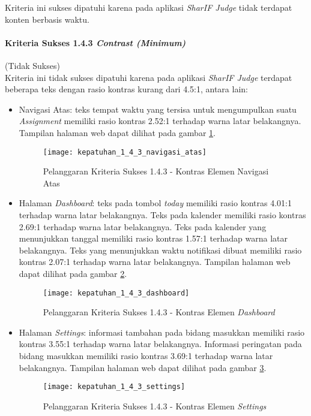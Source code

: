 Kriteria ini sukses dipatuhi karena pada aplikasi \textit{SharIF Judge} tidak terdapat konten berbasis waktu.

\paragraph{Kriteria Sukses 1.4.3 \textit{Contrast (Minimum)}}
\label{subsubsec:kepatuhan_kriteria_1.4.3}
(Tidak Sukses) \\

Kriteria ini tidak sukses dipatuhi karena pada aplikasi \textit{SharIF Judge} terdapat beberapa teks dengan rasio kontras kurang dari 4.5:1, antara lain:
\begin{itemize}
	\item Navigasi Atas: teks tempat waktu yang tersisa untuk mengumpulkan suatu \textit{Assignment} memiliki rasio kontras 2.52:1 terhadap warna latar belakangnya. Tampilan halaman web dapat dilihat pada gambar \ref{fig:kepatuhan_1_4_3_navigasi_atas}.
	\begin{figure}[H]
		\centering  
		\texttt{[image: kepatuhan\_1\_4\_3\_navigasi\_atas]}  
		\caption[Pelanggaran Kriteria Sukses 1.4.3 - Kontras Elemen Navigasi Atas]{Pelanggaran Kriteria Sukses 1.4.3 - Kontras Elemen Navigasi Atas} 
		\label{fig:kepatuhan_1_4_3_navigasi_atas} 
	\end{figure}

	\item Halaman \textit{Dashboard}: teks pada tombol \textit{today} memiliki rasio kontras 4.01:1 terhadap warna latar belakangnya. Teks pada kalender memiliki rasio kontras 2.69:1 terhadap warna latar belakangnya. Teks pada kalender yang menunjukkan tanggal memiliki rasio kontras 1.57:1 terhadap warna latar belakangnya. Teks yang menunjukkan waktu notifikasi dibuat memiliki rasio kontras 2.07:1 terhadap warna latar belakangnya. Tampilan halaman web dapat dilihat pada gambar \ref{fig:kepatuhan_1_4_3_dashboard}.
	\begin{figure}[H]
		\centering  
		\texttt{[image: kepatuhan\_1\_4\_3\_dashboard]}  
		\caption[Pelanggaran Kriteria Sukses 1.4.3 - Kontras Elemen \textit{Dashboard}]{Pelanggaran Kriteria Sukses 1.4.3 - Kontras Elemen \textit{Dashboard}} 
		\label{fig:kepatuhan_1_4_3_dashboard} 
	\end{figure}

	\item Halaman \textit{Settings}: informasi tambahan pada bidang masukkan memiliki rasio kontras 3.55:1 terhadap warna latar belakangnya. Informasi peringatan pada bidang masukkan memiliki rasio kontras 3.69:1 terhadap warna latar belakangnya. Tampilan halaman web dapat dilihat pada gambar \ref{fig:kepatuhan_1_4_3_settings}.
	\begin{figure}[H]
		\centering  
		\texttt{[image: kepatuhan\_1\_4\_3\_settings]}  
		\caption[Pelanggaran Kriteria Sukses 1.4.3 - Kontras Elemen \textit{Settings}]{Pelanggaran Kriteria Sukses 1.4.3 - Kontras Elemen \textit{Settings}} 
		\label{fig:kepatuhan_1_4_3_settings} 
	\end{figure}


\end{itemize}

